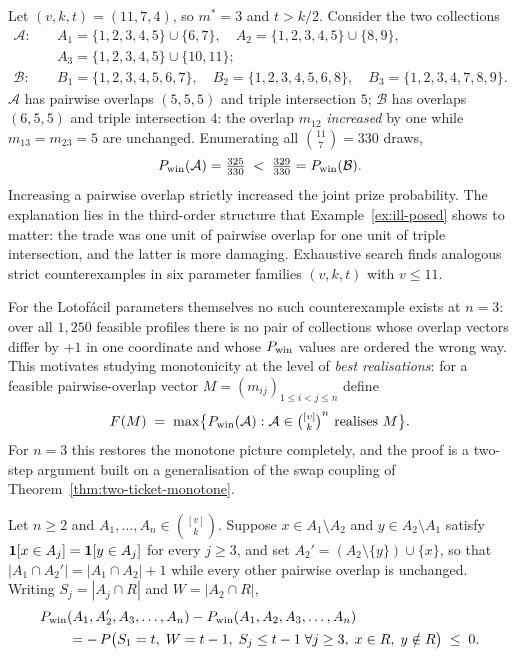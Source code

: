 \begin{example}[Coordinatewise monotonicity fails for $n = 3$]
  \label{ex:counterexample}
  Let $(v,k,t) = (11,7,4)$, so $m^* = 3$ and $t > k/2$.  Consider the two
  collections
  \begin{align*}
    \mathcal{A}:\quad
      & A_1 = \{1,2,3,4,5\} \cup \{6,7\}, \quad
        A_2 = \{1,2,3,4,5\} \cup \{8,9\}, \\
      & A_3 = \{1,2,3,4,5\} \cup \{10,11\}; \\[2pt]
    \mathcal{B}:\quad
      & B_1 = \{1,2,3,4,5,6,7\}, \quad
        B_2 = \{1,2,3,4,5,6,8\}, \quad
        B_3 = \{1,2,3,4,7,8,9\}.
  \end{align*}
  $\mathcal{A}$ has pairwise overlaps $(5,5,5)$ and triple intersection
  $5$; $\mathcal{B}$ has overlaps $(6,5,5)$ and triple intersection $4$:
  the overlap $m_{12}$ \emph{increased} by one while $m_{13} = m_{23} = 5$
  are unchanged.  Enumerating all $\binom{11}{7} = 330$ draws,
  \[
    P_{\mathrm{win}}(\mathcal{A}) = \tfrac{325}{330}
    \;<\; \tfrac{329}{330} = P_{\mathrm{win}}(\mathcal{B}).
  \]
  Increasing a pairwise overlap strictly increased the joint prize
  probability.  The explanation lies in the third-order structure that
  Example~\ref{ex:ill-posed} shows to matter: the trade was one unit of
  pairwise overlap for one unit of triple intersection, and the latter is
  more damaging.  Exhaustive search finds analogous strict counterexamples
  in six parameter families $(v,k,t)$ with $v \le 11$.
\end{example}

For the Lotofácil parameters themselves no such counterexample exists at
$n = 3$: over all $1{,}250$ feasible profiles there is no pair of
collections whose overlap vectors differ by $+1$ in one coordinate and
whose $P_{\mathrm{win}}$ values are ordered the wrong way.  This motivates studying
monotonicity at the level of \emph{best realisations}: for a feasible
pairwise-overlap vector $M = (m_{ij})_{1 \le i < j \le n}$ define
\[
  F(M) \;=\; \max\bigl\{P_{\mathrm{win}}(\mathcal{A}) :
    \mathcal{A} \in \tbinom{[v]}{k}^n \text{ realises } M\bigr\}.
\]
For $n = 3$ this restores the monotone picture completely, and the proof
is a two-step argument built on a generalisation of the swap coupling of
Theorem~\ref{thm:two-ticket-monotone}.

\begin{lemma}
  \label{lem:pattern-swap}
  Let $n \ge 2$ and $A_1, \ldots, A_n \in \binom{[v]}{k}$.  Suppose
  $x \in A_1 \setminus A_2$ and $y \in A_2 \setminus A_1$ satisfy
  $\mathbf{1}\!\left[x \in A_j\right] = \mathbf{1}\!\left[y \in A_j\right]$ for every $j \ge 3$, and set
  $A_2' = (A_2 \setminus \{y\}) \cup \{x\}$, so that
  $|A_1 \cap A_2'| = |A_1 \cap A_2| + 1$ while every other pairwise
  overlap is unchanged.  Writing $S_j = |A_j \cap R|$ and
  $W = |A_2 \cap R|$,
  \begin{align*}
    &P_{\mathrm{win}}(A_1, A_2', A_3, \ldots, A_n)
      - P_{\mathrm{win}}(A_1, A_2, A_3, \ldots, A_n) \\
    &\qquad = -\,P\bigl(S_1 = t,\; W = t-1,\;
        S_j \le t-1 \;\forall j \ge 3,\;
        x \in R,\; y \notin R\bigr)
      \;\le\; 0.
  \end{align*}
\end{lemma}

